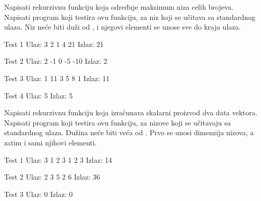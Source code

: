 
\begin{Exercise}[label=109]
Napisati rekurzivnu funkciju koja određuje maksimum niza
  celih brojeva. Napisati program koji testira ovu funkciju, za niz
  koji se učitava sa standardnog ulaza. Niz neće biti duži od , i
  njegovi elementi se unose sve do kraja ulaza.
  
\begin{miditest}
\begin{test}{Test 1}
Ulaz:   3 2 1 4 21    
Izlaz:  21              
\end{test}
\end{miditest}
\begin{minitest}
\begin{test}{Test 2}
Ulaz:   2 -1 0 -5 -10
Izlaz:  2                
\end{test}
\end{minitest}

\begin{miditest}
\begin{test}{Test 3}
Ulaz:  1 11 3 5 8 1    
Izlaz:  11
\end{test}
\end{miditest}
\begin{minitest}
\begin{test}{Test 4}
Ulaz:   5
Izlaz:  5
\end{test}
\end{minitest}
\end{Exercise}
\begin{Answer}[ref=109]
\end{Answer}

\begin{Exercise}[label=110]
Napisati rekurzivnu funkciju koja izračunava skalarni
  proizvod dva data vektora.  Napisati program koji testira ovu
  funkciju, za nizove koji se učitavaju sa standardnog ulaza. Du\v
  zina neće biti veća od . Prvo se unosi dimenzija nizova, a
  zatim i sami njihovi elementi.
  
\begin{miditest}
\begin{test}{Test 1}
Ulaz:    3 1 2 3 1 2 3 
Izlaz:   14                 
\end{test}
\end{miditest}
\begin{minitest}
\begin{test}{Test 2}
Ulaz:   2 3 5 2 6       
Izlaz:   36              
\end{test}
\end{minitest}


\begin{minitest}
\begin{test}{Test 3}
Ulaz:   0
Izlaz:   0
\end{test}
\end{minitest}
\end{Exercise}
\begin{Answer}[ref=110]
\end{Answer}


